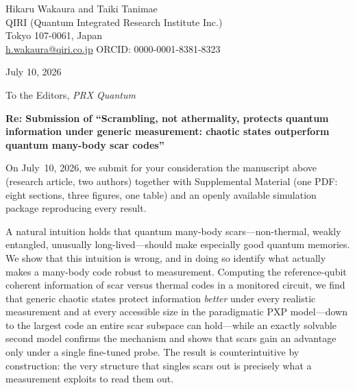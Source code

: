 \documentclass[11pt]{article}
\begin{document}
\pagestyle{empty}

\noindent Hikaru Wakaura and Taiki Tanimae\\
QIRI (Quantum Integrated Research Institute Inc.)\\
Tokyo 107-0061, Japan\\
\href{mailto:h.wakaura@qiri.co.jp}{h.wakaura@qiri.co.jp} \quad ORCID: 0000-0001-8381-8323

\vspace{1em}
\noindent July 10, 2026

\vspace{1em}
\noindent To the Editors, \emph{PRX Quantum}

\vspace{1em}

\noindent \textbf{Re: Submission of ``Scrambling, not athermality, protects
quantum information under generic measurement: chaotic states outperform
quantum many-body scar codes''}

\vspace{0.5em}

On July~10, 2026, we submit for your consideration the manuscript above (research
article, two authors) together with Supplemental Material (one PDF: eight
sections, three figures, one table) and an openly available simulation package
reproducing every result.

\vspace{0.5em}

A natural intuition holds that quantum many-body scars---non-thermal,
weakly entangled, unusually long-lived---should make especially good quantum
memories. We show that this intuition is wrong, and in doing so identify what
actually makes a many-body code robust to measurement. Computing the
reference-qubit coherent information of scar versus thermal codes in a monitored
circuit, we find that generic chaotic states protect information \emph{better}
under every realistic measurement and at every accessible size in the
paradigmatic PXP model---down to the largest code an entire scar subspace can
hold---while an exactly solvable second model confirms the mechanism and shows
that scars gain an advantage only under a single fine-tuned probe. The result
is counterintuitive by construction: the very structure that singles scars out
is precisely what a measurement exploits to read them out.
\end{document}

